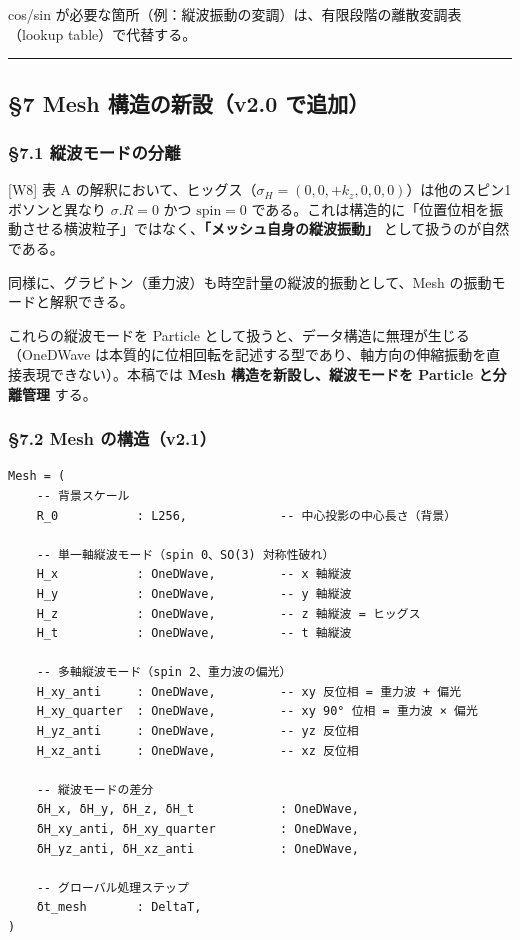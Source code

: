 \documentclass[a4paper,11pt]{ltjsarticle}
\begin{document}
cos/sin
が必要な箇所（例：縦波振動の変調）は、有限段階の離散変調表（lookup
table）で代替する。

\begin{center}\rule{0.5\linewidth}{0.5pt}\end{center}

\subsection{§7 Mesh 構造の新設（v2.0
で追加）}\label{mesh-ux69cbux9020ux306eux65b0ux8a2dv2.0-ux3067ux8ffdux52a0}

\subsubsection{§7.1
縦波モードの分離}\label{ux7e26ux6ce2ux30e2ux30fcux30c9ux306eux5206ux96e2}

{[}W8{]} 表 A
の解釈において、ヒッグス（\(\sigma_H = (0, 0, +k_z, 0, 0, 0)\)）は他のスピン1ボソンと異なり
\(\sigma.R = 0\) かつ \(\text{spin} = 0\)
である。これは構造的に「位置位相を振動させる横波粒子」ではなく、\textbf{「メッシュ自身の縦波振動」}
として扱うのが自然である。

同様に、グラビトン（重力波）も時空計量の縦波的振動として、Mesh
の振動モードと解釈できる。

これらの縦波モードを Particle
として扱うと、データ構造に無理が生じる（OneDWave
は本質的に位相回転を記述する型であり、軸方向の伸縮振動を直接表現できない）。本稿では
\textbf{Mesh 構造を新設し、縦波モードを Particle と分離管理} する。

\subsubsection{§7.2 Mesh
の構造（v2.1）}\label{mesh-ux306eux69cbux9020v2.1}

\begin{verbatim}
Mesh = (
    -- 背景スケール
    R_0           : L256,             -- 中心投影の中心長さ（背景）
    
    -- 単一軸縦波モード（spin 0、SO(3) 対称性破れ）
    H_x           : OneDWave,         -- x 軸縦波
    H_y           : OneDWave,         -- y 軸縦波
    H_z           : OneDWave,         -- z 軸縦波 = ヒッグス
    H_t           : OneDWave,         -- t 軸縦波
    
    -- 多軸縦波モード（spin 2、重力波の偏光）
    H_xy_anti     : OneDWave,         -- xy 反位相 = 重力波 + 偏光
    H_xy_quarter  : OneDWave,         -- xy 90° 位相 = 重力波 × 偏光
    H_yz_anti     : OneDWave,         -- yz 反位相
    H_xz_anti     : OneDWave,         -- xz 反位相
    
    -- 縦波モードの差分
    δH_x, δH_y, δH_z, δH_t            : OneDWave,
    δH_xy_anti, δH_xy_quarter         : OneDWave,
    δH_yz_anti, δH_xz_anti            : OneDWave,
    
    -- グローバル処理ステップ
    δt_mesh       : DeltaT,
)
\end{verbatim}
\end{document}
